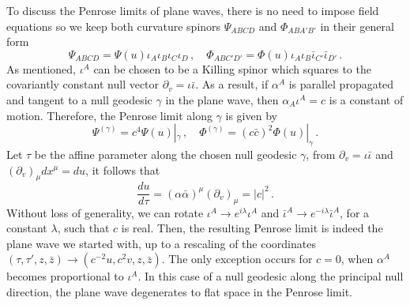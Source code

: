 To discuss the Penrose limits of plane waves, there is no need to impose field equations so we keep both curvature spinors $\Psi_{ABCD}$ and $\Phi_{ABA'B'}$ in their general form
\begin{equation}\label{Penrose:eqn:psiNplane}
\Psi_{ABCD} = \Psi(u) \iota_{A}\iota_{B}\iota_{C}\iota_{D} \, , \quad \Phi_{ABC'D'} = \Phi(u) \iota_{A}\iota_{B}\bar{\iota}_{C'}\bar{\iota}_{D'} \, .
\end{equation}
As mentioned, $\iota^A$ can be chosen to be a Killing spinor which squares to the covariantly constant null vector $\partial_v = \iota \bar{\iota}$. As a result, if $\alpha^{A}$ is parallel propagated and tangent to a null geodesic $\gamma$ in the plane wave, then $\alpha_{A} \iota^{A} = c$ is a constant of motion. Therefore, the Penrose limit along $\gamma$ is given by
\begin{equation}\label{Penrose:eqn:penroselimitplane}
    \Psi^{(\gamma)}  = c^4 \Psi(u)|_{\gamma}  \, , \quad \Phi^{(\gamma)}  = (c \bar{c})^{2} \Phi(u)|_{\gamma} \, .
\end{equation}
Let $\tau$ be the affine parameter along the chosen null geodesic $\gamma$, from $\partial_v = \iota \bar{\iota}$ and $\left(\partial_v\right)_{\mu}dx^{\mu} = du$, it follows that
\begin{equation}\label{Penrose:eqn:dtaudu}
\frac{du}{d \tau} = (\alpha \bar{\alpha})^{\mu}\left(\partial_v\right)_{\mu} = |c|^2  \, .
\end{equation}
Without loss of generality, we can rotate $\iota^A \to e^{i \lambda} \iota^A$ and $\bar{\iota}^A \to e^{-i \lambda} \bar{\iota}^A$, for a constant $\lambda$, such that $c$ is real. Then, the resulting Penrose limit is indeed the plane wave we started with, up to a rescaling of the coordinates $(\tau,\tau',z,\bar{z}) \to (c^{-2} u, c^{2} v,z,\bar{z})$. The only exception occurs for $c = 0$, when $\alpha^{A}$ becomes proportional to $\iota^A$. In this case of a null geodesic along the principal null direction, the plane wave degenerates to flat space in the Penrose limit. 

